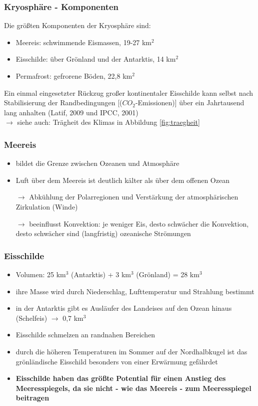 \begin{frame}
	\frametitle{Kryosphäre - Komponenten}
	Die größten Komponenten der Kryosphäre sind: 
	\begin{itemize}
		\item Meereis: schwimmende Eismassen, 19-27 km$^2$
		\item Eisschilde: über Grönland und der Antarktis, 14 km$^2$
		\item Permafrost: gefrorene Böden, 22,8 km$^2$
	\end{itemize}
	
	\glqq Ein einmal eingesetzter Rückzug großer kontinentaler Eisschilde kann selbst nach Stabilisierung der Randbedingungen [($CO_2$-Emissionen)] über ein Jahrtausend lang anhalten\grqq{} (Latif, 2009 und IPCC, 2001)\\
	$\rightarrow$ siehe auch: Trägheit des Klimas in Abbildung \ref{fig:traegheit}
\end{frame}

\begin{frame}
	\frametitle{Meereis}
	\begin{itemize}
		\item bildet die Grenze zwischen Ozeanen und Atmosphäre
		\item Luft über dem Meereis ist deutlich kälter als über dem offenen Ozean 
		\item [$\rightarrow$] Abkühlung der Polarregionen und Verstärkung der atmosphärischen Zirkulation (Winde)
		\item [$\rightarrow$] beeinflusst Konvektion: je weniger Eis, desto schwächer die Konvektion, desto schwächer sind (langfristig) ozeanische Strömungen 
	\end{itemize}
\end{frame}

\begin{frame}
	\frametitle{Eisschilde}
	\begin{itemize}
		\item Volumen: 25 km$^3$ (Antarktis) + 3 km$^3$ (Grönland) = 28 km$^3$
		\item ihre Masse wird durch Niederschlag, Lufttemperatur und Strahlung bestimmt %
		\item in der Antarktis gibt es Ausläufer des Landeises auf den Ozean hinaus (Schelfeis) $\rightarrow$ 0,7 km$^3$
		\item Eisschilde schmelzen an randnahen Bereichen
		\item durch die höheren Temperaturen im Sommer auf der Nordhalbkugel ist das grönländische Eisschild besonders von einer Erwärmung gefährdet
		\item \textbf{Eisschilde haben das größte Potential für einen Anstieg des Meeresspiegels, da sie nicht - wie das Meereis - zum Meeresspiegel beitragen}
	\end{itemize}
\end{frame}

